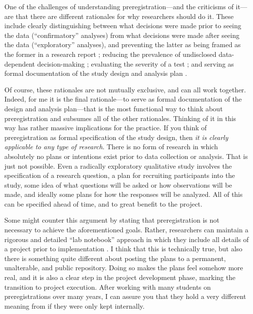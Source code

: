 \documentclass[authordate, empirical]{jote-new-article}
\begin{document}
One of the challenges of understanding preregistration—and the criticisms of it—are that there are different rationales for why researchers should do it. These include clearly distinguishing between what decisions were made prior to seeing the data (“confirmatory” analyses) from what decisions were made after seeing the data (“exploratory” analyses), and preventing the latter as being framed as the former in a research report \parencites{Wagenmakers2012}; reducing the prevalence of undisclosed data-dependent decision-making \parencites[i.e., \emph{p}-hacking, questionable research practices, researcher degrees of freedom;][]{Srivastava2018}; evaluating the severity of a test \parencites{Lakens2019}; and serving as formal documentation of the study design and analysis plan \parencites{Haven2019}.







Of course, these rationales are not mutually exclusive, and can all work together. Indeed, for me it is the final rationale—to serve as formal documentation of the design and analysis plan—that is the most functional way to think about preregistration and subsumes all of the other rationales. Thinking of it in this way has rather massive implications for the practice. If you think of preregistration as formal specification of the study design, then \emph{it is clearly applicable to any type of research}. There is no form of research in which absolutely no plans or intentions exist prior to data collection or analysis. That is just not possible. Even a radically exploratory qualitative study involves the specification of a research question, a plan for recruiting participants into the study, some idea of what questions will be asked or how observations will be made, and ideally some plans for how the responses will be analyzed. All of this can be specified ahead of time, and to great benefit to the project.







Some might counter this argument by stating that preregistration is not necessary to achieve the aforementioned goals. Rather, researchers can maintain a rigorous and detailed “lab notebook” approach in which they include all details of a project prior to implementation \parencites[see][for a discussion of this approach in relation to preregistration]{Cruwell2019}. I think that this is technically true, but also there is something quite different about posting the plans to a permanent, unalterable, and public repository. Doing so makes the plans feel somehow more real, and it is also a clear step in the project development phase, marking the transition to project execution. After working with many students on preregistrations over many years, I can assure you that they hold a very different meaning from if they were only kept internally.
\end{document}
